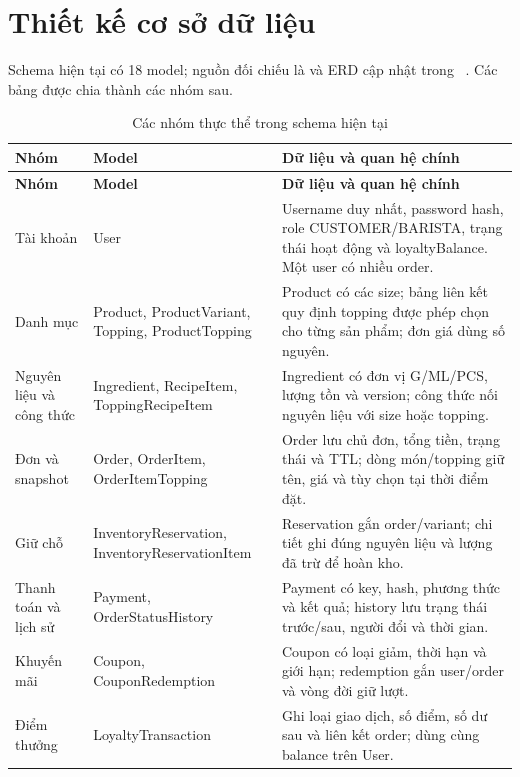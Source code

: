 \section{Thiết kế cơ sở dữ liệu}
Schema hiện tại có 18 model; nguồn đối chiếu là
 và ERD cập nhật trong
~\cite{schema,erd}. Các bảng được
chia thành các nhóm sau.
{\small{}
\begin{longtable}{@{}L{0.20\textwidth}L{0.36\textwidth}L{0.37\textwidth}@{}}
\caption{Các nhóm thực thể trong schema hiện tại}\label{tab:entities}\\
\toprule\textbf{Nhóm} & \textbf{Model} & \textbf{Dữ liệu và quan hệ chính} \\\midrule\endfirsthead
\toprule\textbf{Nhóm} & \textbf{Model} & \textbf{Dữ liệu và quan hệ chính} \\\midrule\endhead
\bottomrule\endfoot
Tài khoản & User & Username duy nhất, password hash, role CUSTOMER/BARISTA, trạng thái hoạt động và loyaltyBalance. Một user có nhiều order. \\
Danh mục & Product, ProductVariant, Topping, ProductTopping & Product có các size; bảng liên kết quy định topping được phép chọn cho từng sản phẩm; đơn giá dùng số nguyên. \\
Nguyên liệu và công thức & Ingredient, RecipeItem, ToppingRecipeItem & Ingredient có đơn vị G/ML/PCS, lượng tồn và version; công thức nối nguyên liệu với size hoặc topping. \\
Đơn và snapshot & Order, OrderItem, OrderItemTopping & Order lưu chủ đơn, tổng tiền, trạng thái và TTL; dòng món/topping giữ tên, giá và tùy chọn tại thời điểm đặt. \\
Giữ chỗ & InventoryReservation, InventoryReservationItem & Reservation gắn order/variant; chi tiết ghi đúng nguyên liệu và lượng đã trừ để hoàn kho. \\
Thanh toán và lịch sử & Payment, OrderStatusHistory & Payment có key, hash, phương thức và kết quả; history lưu trạng thái trước/sau, người đổi và thời gian. \\
Khuyến mãi & Coupon, CouponRedemption & Coupon có loại giảm, thời hạn và giới hạn; redemption gắn user/order và vòng đời giữ lượt. \\
Điểm thưởng & LoyaltyTransaction & Ghi loại giao dịch, số điểm, số dư sau và liên kết order; dùng cùng balance trên User. \\
\end{longtable}}

